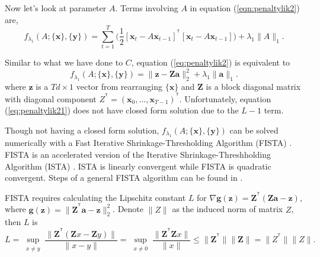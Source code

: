 \documentclass[fleqn]{article}
\let\oldref\ref
\renewcommand{\ref}[1]{(\oldref{#1})}
\newcommand{\T}{^{\ensuremath{\mathsf{T}}}}           %
\begin{document}
Now let's look at parameter $A$. Terms involving $A$ in equation \ref{eqn:penaltylik2} are,
\begin{equation}\label{eq:penaltylik2}
f_{\lambda_1}(A;\{\mathbf{x}\},\{\mathbf{y}\}) = \sum\limits_{t=1}^{T}\big(\frac{1}{2}[\mathbf{x}_t-A\mathbf{x}_{t-1}]^{\T}[\mathbf{x}_t-A\mathbf{x}_{t-1}]\big)+\lambda_1 \|A\|_1.
\end{equation}

Similar to what we have done to $C$, equation \ref{eq:penaltylik2} is equivalent to
\begin{equation}\label{eq:penaltylik21}
f_{\lambda_1}(A;\{\mathbf{x}\},\{\mathbf{y}\}) =  \|\mathbf{z}  - \mathbf{Za}\|_2^2 + \lambda_1\|\mathbf{a}\|_1.
\end{equation}
where $\mathbf{z}$ is a $Td \times 1$ vector from rearranging $\{\mathbf{x}\}$ and $\mathbf{Z}$ is a block diagonal matrix with diagonal component $Z^{\T} =(\mathbf{x}_0,\ldots,\mathbf{x}_{T-1})^{\T}$. Unfortunately, equation \ref{eq:penaltylik21} does not have closed form solution due to the $L-1$ term.


Though not having a closed form solution, $f_{\lambda_1}(A;\{\mathbf{x}\},\{\mathbf{y}\})$ can be solved numerically with a Fast Iterative Shrinkage-Thresholding Algorithm (FISTA) \cite{beck2009fast}. FISTA is an accelerated version of the Iterative Shrinkage-Threshholding Algorithm (ISTA) \cite{daubechies2004iterative}. ISTA is linearly convergent while FISTA is quadratic convergent. Steps of a general FISTA algorithm can be found in .

FISTA requires calculating the Lipschitz constant $L$ for $\nabla\mathbf{g(z)}=\mathbf{Z}^{\T}(\mathbf{Z}\mathbf{a} -\mathbf{z})$, where $\mathbf{g}(\mathbf{z})=\|\mathbf{Z}^{\T}\mathbf{a} -\mathbf{z}\|_2^2$. Denote $\|Z\|$ as the induced norm of matrix $Z$, then $L$ is
\[
L = \sup_{\substack{x\neq y}}\frac{\|\mathbf{Z}^{\T}(\mathbf{Z}x- \mathbf{Z}y)\|}{\|x-y\|}=\sup_{\substack{x\neq 0}}\frac{\|\mathbf{Z}^{\T}\mathbf{Z}x\|}{\|x\|}\leq\|\mathbf{Z}^{\T}\|\|\mathbf{Z}\| = \|Z^{\T}\|\|Z\|.
\]
\end{document}
